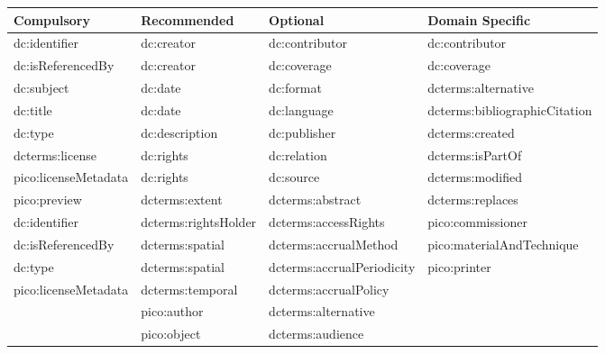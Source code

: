 \documentclass[epsfig,a4paper,12pt,titlepage]{book}
\begin{document}
\begin{center}

\begin{table}[h]
\tiny
\begin{adjustbox}{width=\textwidth}
\begin{tabular}{|p{3.5cm}|p{3.5cm}|p{4.8cm}|p{3.8cm}|}  
\hline
Compulsory           & Recommended          & Optional                      & Domain Specific                 \\ \hline
dc:identifier        & dc:creator           & dc:contributor                & dc:contributor                  \\
dc:isReferencedBy    & dc:creator           & dc:coverage                   & dc:coverage                     \\
dc:subject           & dc:date              & dc:format                     & dcterms:alternative             \\
dc:title             & dc:date              & dc:language                   & dcterms:bibliographicCitation   \\
dc:type              & dc:description       & dc:publisher                  & dcterms:created                 \\
dcterms:license      & dc:rights            & dc:relation                   & dcterms:isPartOf                \\
pico:licenseMetadata & dc:rights            & dc:source                     & dcterms:modified                \\
pico:preview         & dcterms:extent       & dcterms:abstract              & dcterms:replaces                \\
dc:identifier        & dcterms:rightsHolder & dcterms:accessRights          & pico:commissioner               \\
dc:isReferencedBy    & dcterms:spatial      & dcterms:accrualMethod         & pico:materialAndTechnique       \\
dc:type              & dcterms:spatial      & dcterms:accrualPeriodicity    & pico:printer                    \\
pico:licenseMetadata & dcterms:temporal     & dcterms:accrualPolicy         &                                 \\
                     & pico:author          & dcterms:alternative           &                                 \\
                     & pico:object          & dcterms:audience              &                                 \\

\end{tabular}
\end{adjustbox}
\end{table}
\end{center}
\end{document}
